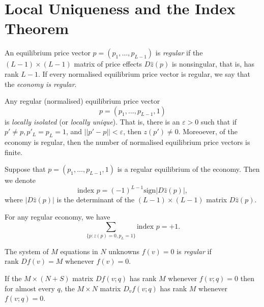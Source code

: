 \section{Local Uniqueness and the Index Theorem}

\begin{defn}
    An equilibrium price vector $p = (p_1, \dots, p_{L - 1})$ is \emph{regular} if the $(L - 1) \times (L - 1)$ matrix of price effects $D \hat{z}(p)$ is nonsingular, that is, has rank $L - 1$. If every normalised equilibrium price vector is regular, we say that the \emph{economy is regular}.
\end{defn}

\begin{prop}
    Any regular (normalised) equilibrium price vector
    \begin{equation*}
        p = (p_1, \dots, p_{L - 1}, 1)
    \end{equation*}
    is \emph{locally isolated} (or \emph{locally unique}). That is, there is an $\varepsilon > 0$ such that if $p' \neq p, p'_L = p_L = 1$, and $||p' - p|| < \varepsilon$, then $z(p') \neq 0$. Moreoever, of the economy is regular, then the number of normalised equilibrium price vectors is finite.
\end{prop}

\begin{defn}
    Suppose that $p = (p_1, \dots, p_{L - 1}, 1)$ is a regular equilibrium of the economy. Then we denote
    \begin{equation*}
        \text{index } p = (-1)^{L - 1} \text{sign} |D \hat{z}(p)|,
    \end{equation*}
    where $|D \hat{z}(p)|$ is the determinant of the $(L - 1) \times (L - 1)$ matrix $D \hat{z}(p)$.
\end{defn}

\begin{prop}
    For any regular economy, we have 
    \begin{equation*}
        \sum_{\{p: z(p) = 0, p_L = 1\}} \text{index } p = +1.
    \end{equation*}
\end{prop}

\begin{defn}
    The system of $M$ equations in $N$ unknowns $f(v) = 0$ is \emph{regular} if $\text{rank } Df(v) = M$ whenever $f(v) = 0$.
\end{defn}

\begin{prop}
    If the $M \times (N + S)$ matrix $D f(v; q)$ has rank $M$ whenever $f(v; q) = 0$ then for almost every $q$, the $M \times N$ matrix $D_v f(v; q)$ has rank $M$ whenever $f(v; q) = 0$.
\end{prop}

